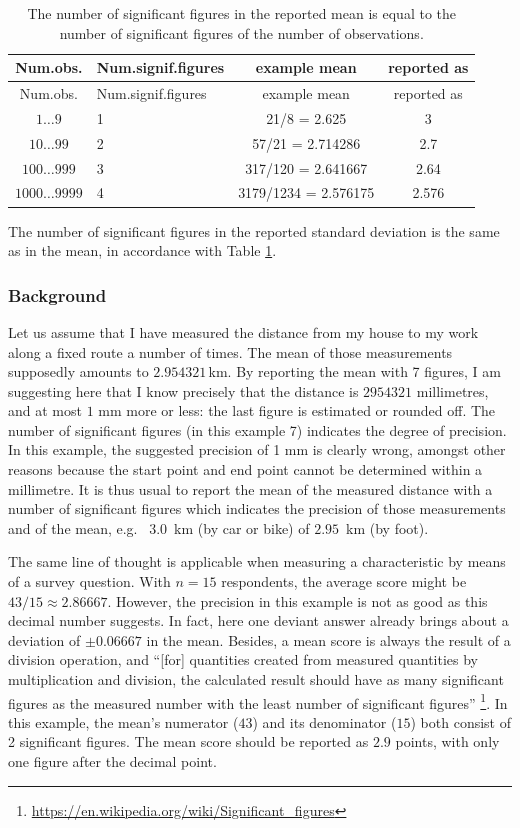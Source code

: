 \documentclass[
]{book}
\begin{document}
\begin{longtable}[]{@{}clcc@{}}
\caption{\label{tab:signiffiguresmean} The number of significant figures in the reported mean is
equal to the number of significant figures of the number of observations.}\tabularnewline
\toprule
Num.obs. & Num.signif.figures & example mean & reported as\tabularnewline
\midrule
\endfirsthead
\toprule
Num.obs. & Num.signif.figures & example mean & reported as\tabularnewline
\midrule
\endhead
\(1\dots9\) & 1 & 21/8 = 2.625 & 3\tabularnewline
\(10\dots99\) & 2 & 57/21 = 2.714286 & 2.7\tabularnewline
\(100\dots999\) & 3 & 317/120 = 2.641667 & 2.64\tabularnewline
\(1000\dots9999\) & 4 & 3179/1234 = 2.576175 & 2.576\tabularnewline
\bottomrule
\end{longtable}

The number of significant figures in the reported standard deviation is
the same as in the mean, in accordance with
Table \ref{tab:signiffiguresmean}.

\hypertarget{background}{%
\subsubsection{Background}\label{background}}

Let us assume that I have measured the distance from my house to my work
along a fixed route a number of times. The mean of those measurements
supposedly amounts to \(2.954321\) km. By reporting the mean with 7 figures,
I am suggesting here that I know precisely that the distance is \(2954321\) millimetres,
and at most \(1\) mm more or less:
the last figure is estimated or rounded off. The number of significant figures
(in this example 7) indicates the degree of precision. In this example, the
suggested precision of 1 mm is clearly
wrong, amongst other reasons because the start point and end point cannot be determined
within a millimetre. It is thus usual to report the mean of the measured
distance with a number of significant figures which indicates the precision
of those measurements and of the mean, e.g.~
\(3.0\)~km (by car or bike) of \(2.95\)~km (by foot).

The same line of thought is applicable when measuring a characteristic
by means of a survey question. With \(n=15\) respondents, the average score
might be \(43/15 \approx 2.86667\). However, the precision
in this example is not as good as this decimal number suggests. In fact,
here one deviant answer already brings about a deviation of
\(\pm0.06667\) in the mean. Besides, a mean score
is always the result of a division operation, and
``{[}for{]} quantities created from measured quantities by multiplication and division, the calculated result should have as many significant figures as the measured number with the least number of significant figures'' \footnote{\url{https://en.wikipedia.org/wiki/Significant_figures}}.
In this example, the mean's numerator (\(43\)) and its denominator (\(15\)) both consist
of 2 significant figures. The mean score should be reported as \(2.9\) points, with only
one figure after the decimal point.
\end{document}
